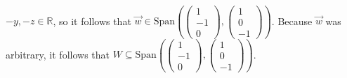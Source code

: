\documentclass[12pt]{article}
\newenvironment{problem}[2][Problem]
{
	\begin{trivlist} 
		\item[\hskip \labelsep {\bfseries #1 #2:}]
	}
{
	\end{trivlist}
	}
\newenvironment{solution}[1][Solution]
{
	\begin{trivlist} 
		\item[\hskip \labelsep {\itshape #1:}]
	}
	{
	\end{trivlist}
}
\begin{document}
\begin{problem}{6}
\begin{solution}
\begin{align*}
\end{align*}
$-y,-z \in \mathbb{R}$, so it follows that $\vec{w} \in \text{Span}\left(\begin{pmatrix}1\\-1\\0\end{pmatrix}, \begin{pmatrix}1\\0\\-1\end{pmatrix}\right)$. Because $\vec{w}$ was arbitrary, it follows that $W \subseteq \text{Span}\left(\begin{pmatrix}1\\-1\\0\end{pmatrix}, \begin{pmatrix}1\\0\\-1\end{pmatrix}\right)$.


\end{solution}
\end{problem}
\end{document}

